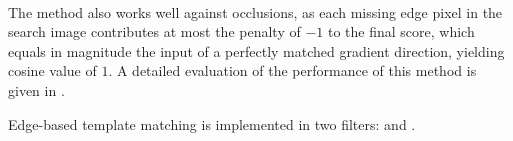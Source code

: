 \paragraph*{}
The method also works well against occlusions, as each missing edge pixel in the search image contributes at most the penalty of $-1$ to the final score, which equals in magnitude the input of a perfectly matched gradient direction, yielding cosine value of $1$. A detailed evaluation of the performance of this method is given in \cite{UlrichSteger02}.

\begin{refImpl}
Edge-based template matching is implemented in two \studio filters:  and .
\end{refImpl}